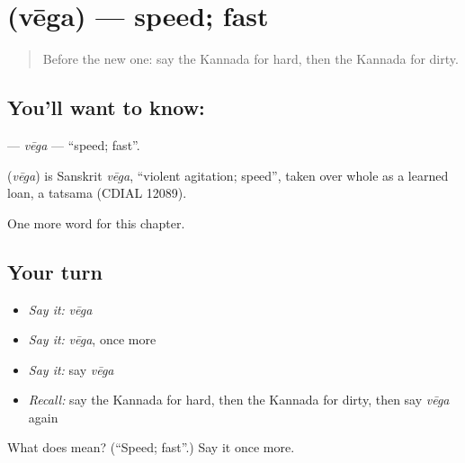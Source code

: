 \section[\texorpdfstring{\kn{ವೇಗ} (vēga)}{ವೇಗ (vēga)}]{ (vēga) — speed; fast}

\label{lesson:KA-C141-vega}



\begin{quote}
Before the new one: say the Kannada for hard, then the Kannada for dirty.
\end{quote}

\subsection*{You'll want to know: }
\textbf{} — \emph{vēga} — \textquotedblleft{}speed; fast\textquotedblright{}.

\begin{cousinweb}
\textbf{} (\emph{vēga}) is Sanskrit \emph{vēga}, \textquotedblleft{}violent agitation; speed\textquotedblright{}, taken over whole as a learned loan, a tatsama (CDIAL 12089).
\end{cousinweb}

\begin{grammarlens}[title={What you've built}]
One more word for this chapter.
\end{grammarlens}

\subsection*{Your turn}
\begin{itemize}
\raggedright
  \item \emph{Say it:} \emph{vēga}
  \item \emph{Say it:} \emph{vēga}, once more
  \item \emph{Say it:} say \emph{vēga}
  \item \emph{Recall:} say the Kannada for hard, then the Kannada for dirty, then say \emph{vēga} again
\end{itemize}

\begin{tcolorbox}[breakable,colback=teal!4,colframe=teal!35!black,title={Before you move on}]
What does  mean? (\textquotedblleft{}Speed; fast\textquotedblright{}.) Say it once more.
\end{tcolorbox}
